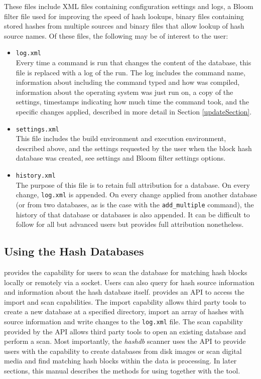 \documentclass[11pt,fleqn]{article} %
\begin{document}
These files include XML files containing configuration settings and logs, a Bloom filter file used for improving the speed of hash lookups, binary files containing stored hashes from multiple sources and binary files that allow lookup of hash source names. Of these files, the following may be of interest to the user:
\begin{itemize}
\item \texttt{log.xml} \\
Every time a command is run that changes the content of the database, this file is replaced with a log of the run.
The log includes the command name, information about \hash including the command typed and how \hash was compiled, information about the operating system \hash was just run on, a copy of the \hash settings, timestamps indicating how much time the command took, and the specific \hash changes applied, described in more detail in Section \ref{updateSection}.
\item \texttt{settings.xml} \\
This file includes the build environment and execution environment, described above, and the settings requested by the user when the block hash database was created, see \hash settings and Bloom filter settings options.
\item \texttt{history.xml} \\
The purpose of this file is to retain full attribution for a database.
On every change, \texttt{log.xml} is appended.
On every change applied from another database
(or from two databases, as is the case with the \texttt{add\_multiple} command),
the history of that database or databases is also appended.
It can be difficult to follow for all but advanced users but provides full attribution nonetheless.
\end{itemize}



\subsection{Using the Hash Databases}
\label{usingSection}
\hash provides the capability for users to scan the database for matching hash blocks locally or remotely via a socket. Users can also query for hash source information and information about the hash database itself. \hash provides an API to access the import and scan capabilities.  The import capability allows third party tools to create a new database at a specified directory, import an array of hashes with source information and write changes to the \texttt{log.xml} file. The scan capability provided by the API allows third party tools to open an existing database and perform a scan. Most importantly, the \bulk \textit{hashdb} scanner uses the \hash API to provide users with the capability to create databases from disk images or scan digital media and find matching hash blocks within the data \bulk is processing. In later sections, this manual describes the methods for using \bulk together with the \hash tool. 
\end{document}
